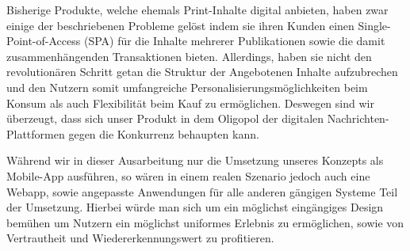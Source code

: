 Bisherige Produkte, welche ehemals Print-Inhalte digital anbieten, haben zwar einige der beschriebenen Probleme gelöst indem sie ihren Kunden einen Single-Point-of-Access (SPA) für die Inhalte mehrerer Publikationen sowie die damit zusammenhängenden Transaktionen bieten. Allerdings, haben sie nicht den revolutionären Schritt getan die Struktur der Angebotenen Inhalte aufzubrechen und den Nutzern somit umfangreiche Personalisierungsmöglichkeiten beim Konsum als auch Flexibilität beim Kauf zu ermöglichen. Deswegen sind wir überzeugt, dass sich unser Produkt in dem Oligopol der digitalen Nachrichten-Plattformen gegen die Konkurrenz behaupten kann.

Während wir in dieser Ausarbeitung nur die Umsetzung unseres Konzepts als Mobile-App ausführen, so wären in einem realen Szenario jedoch auch eine Webapp, sowie angepasste Anwendungen für alle anderen gängigen Systeme Teil der Umsetzung. Hierbei würde man sich um ein möglichst eingängiges Design bemühen um Nutzern ein möglichst uniformes Erlebnis zu ermöglichen, sowie von Vertrautheit und Wiedererkennungswert zu profitieren.
